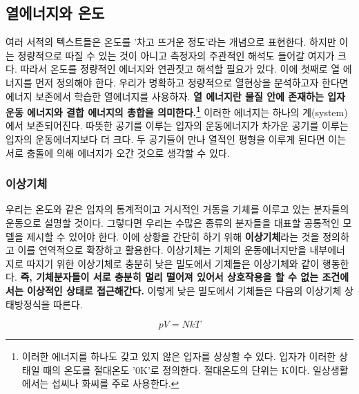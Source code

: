 \begin{flushleft}
     \subsection{열에너지와 온도}
     여러 서적의 텍스트들은 온도를 '차고 뜨거운 정도'라는 개념으로 표현한다. 하지만 이는 정량적으로 따질 수 있는
     것이 아니고 측정자의 주관적인 해석도 들어갈 여지가 크다. 따라서 온도를 정량적인 에너지와 연관짓고 해석할
     필요가 있다. 이에 첫째로 열 에너지를 먼저 정의해야 한다.
     우리가 명확하고 정량적으로 열현상을 분석하고자 한다면 에너지 보존에서 학습한 열에너지를 사용하자.
    \textbf{열 에너지란 물질 안에 존재하는 입자 운동 에너지와 결합 에너지의 총합을 의미한다.\footnote{이러한 에너지를 하나도 갖고 있지 
    않은 입자를 상상할 수 있다. 입자가 이러한 상태일 때의 온도를 절대온도 '0K'로 정의한다. 절대온도의 단위는 K이다. 일상생활에서는
    섭씨나 화씨를 주로 사용한다.}} 
    이러한 에너지는 하나의 계(system)에서 보존되어진다. 따뜻한 공기를 이루는 입자의 운동에너지가 차가운 공기를 이루는 입자의 운동에너지보다
     더 크다. 두 공기들이 만나 열적인 평형을 이루게 된다면 이는 서로 충돌에 의해 에너지가 오간 것으로 생각할 수 있다.  
    
    \subsubsection*{이상기체}
우리는 온도와 같은 입자의 통계적이고 거시적인 거동을 기체를 이루고 있는 분자들의 운동으로 설명할 것이다. 그렇다면 우리는 수많은 종류의 분자들을 대표할
공통적인 모델을 제시할 수 있어야 한다. 이에 상황을 간단히 하기 위해 \textbf{이상기체}라는 것을 정의하고 이를 연역적으로 확장하고 활용한다. 이상기체는 
기체의 운동에너지만을 내부에너지로 따지기 위한 이상기체로 충분히 낮은 밀도에서 기체들은 이상기체와 같이 행동한다. 
\textbf{즉, 기체분자들이 서로 충분히 멀리 떨어져 있어서 상호작용을 할 수 없는 조건에서는 이상적인 상태로 접근해간다.} 
이렇게 낮은 밀도에서 기체들은 다음의 이상기체 상태방정식을 따른다. 

    \begin{defn}

    \begin{equation}\label{eq:ideal gas}
    pV=NkT
    \end{equation}


\end{defn}
\end{flushleft}
